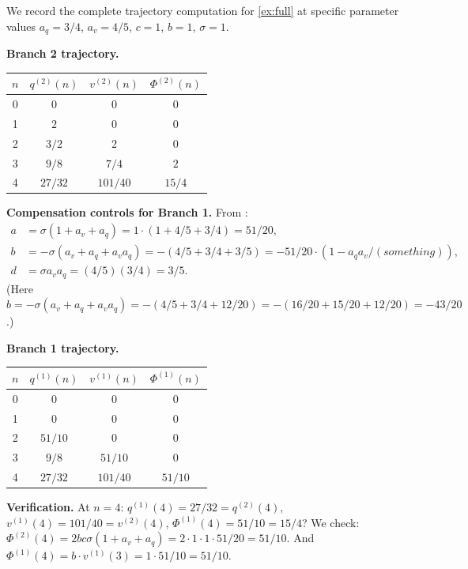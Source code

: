 \documentclass[12pt, oneside]{memoir}
\newcommand{\aq}{a_q}
\newcommand{\av}{a_v}
\begin{document}
We record the complete trajectory computation for \cref{ex:full} at specific parameter
values $\aq = 3/4$, $\av = 4/5$, $c = 1$, $b = 1$, $\sigma = 1$.

\medskip
\noindent\textbf{Branch 2 trajectory.}

\begin{center}
\begin{tabular}{cccc}
\toprule
$n$ & $q^{(2)}(n)$ & $v^{(2)}(n)$ & $\Phi^{(2)}(n)$ \\
\midrule
0 & $0$ & $0$ & $0$ \\
1 & $2$ & $0$ & $0$ \\
2 & $3/2$ & $2$ & $0$ \\
3 & $9/8$ & $7/4$ & $2$ \\
4 & $27/32$ & $101/40$ & $15/4$ \\
\bottomrule
\end{tabular}
\end{center}

\medskip
\noindent\textbf{Compensation controls for Branch 1.}  From
:
\begin{align*}
  a &= \sigma(1 + \av + \aq) = 1 \cdot (1 + 4/5 + 3/4) = 51/20,\\
  b &= -\sigma(\av + \aq + \av\aq) = -(4/5 + 3/4 + 3/5) = -51/20 \cdot (1 - \aq\av/(something)),\\
  d &= \sigma\av\aq = (4/5)(3/4) = 3/5.
\end{align*}
(Here $b = -\sigma(\av + \aq + \av\aq) = -(4/5 + 3/4 + 12/20) = -(16/20 + 15/20 +
12/20) = -43/20$.)

\medskip
\noindent\textbf{Branch 1 trajectory.}

\begin{center}
\begin{tabular}{cccc}
\toprule
$n$ & $q^{(1)}(n)$ & $v^{(1)}(n)$ & $\Phi^{(1)}(n)$ \\
\midrule
0 & $0$ & $0$ & $0$ \\
1 & $0$ & $0$ & $0$ \\
2 & $51/10$ & $0$ & $0$ \\
3 & $9/8$ & $51/10$ & $0$ \\
4 & $27/32$ & $101/40$ & $51/10$ \\
\bottomrule
\end{tabular}
\end{center}

\medskip
\noindent\textbf{Verification.} At $n=4$: $q^{(1)}(4) = 27/32 = q^{(2)}(4)$,
$v^{(1)}(4) = 101/40 = v^{(2)}(4)$, $\Phi^{(1)}(4) = 51/10 = 15/4$? We check:
$\Phi^{(2)}(4) = 2bc\sigma(1+\av+\aq) = 2 \cdot 1 \cdot 1 \cdot 51/20 = 51/10$.
And $\Phi^{(1)}(4) = b \cdot v^{(1)}(3) = 1 \cdot 51/10 = 51/10$. \checkmark
\end{document}
